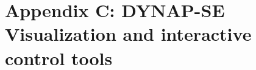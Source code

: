  \chapter{Appendix C: DYNAP-SE Visualization and interactive control tools}
 \label{appendix:bias_tuning_tools}